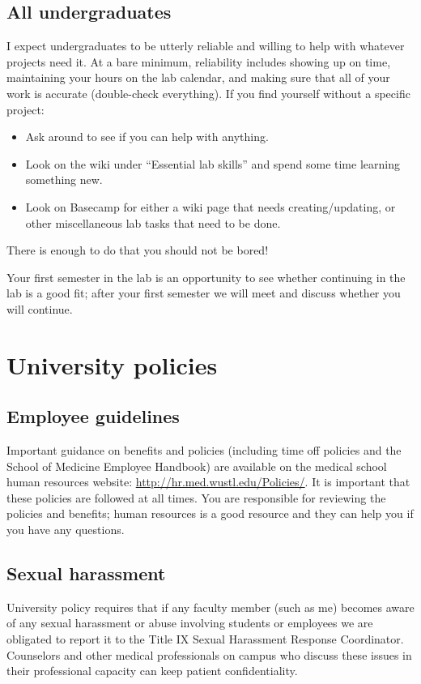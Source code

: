 \documentclass[letterpaper,12pt,oneside]{memoir}
\begin{document}
\subsection{All undergraduates}

I expect undergraduates to be utterly reliable and willing to help with whatever projects need it. At a bare minimum, reliability includes showing up on time, maintaining your hours on the lab calendar, and making sure that all of your work is accurate (double-check everything). If you find yourself without a specific project:

\begin{itemize}
\item Ask around to see if you can help with anything.
\item Look on the wiki under ``Essential lab skills'' and spend some time learning something new.
\item Look on Basecamp for either a wiki page that needs creating/updating, or other miscellaneous lab tasks that need to be done.
\end{itemize}

There is enough to do that you should not be bored!

Your first semester in the lab is an opportunity to see whether continuing in the lab is a good fit; after your first semester we will meet and discuss whether you will continue.

\section{University policies}

\subsection{Employee guidelines}
Important guidance on benefits and policies (including time off policies and the School of Medicine Employee Handbook) are available on the medical school human resources website: \url{http://hr.med.wustl.edu/Policies/}. It is important that these policies are followed at all times. You are responsible for reviewing the policies and benefits; human resources is a good resource and they can help you if you have any questions.

\subsection{Sexual harassment}
University policy requires that if any faculty member (such as me) becomes aware of any sexual harassment or abuse involving students or employees we are obligated to report it to the Title IX Sexual Harassment Response Coordinator. Counselors and other medical professionals on campus who discuss these issues in their professional capacity can keep patient confidentiality.
\end{document}
